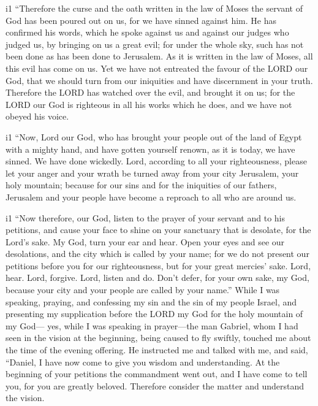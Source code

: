 i1 ``Therefore the curse and the oath written in the law of Moses the
servant of God has been poured out on us, for we have sinned against
him.  He has confirmed his words, which he spoke against
us and against our judges who judged us, by bringing on us a great evil;
for under the whole sky, such has not been done as has been done to
Jerusalem.  As it is written in the law of Moses, all
this evil has come on us. Yet we have not entreated the favour of the
LORD our God, that we should turn from our iniquities and have
discernment in your truth.  Therefore the LORD has
watched over the evil, and brought it on us; for the LORD our God is
righteous in all his works which he does, and we have not obeyed his
voice.

i1 ``Now, Lord our God, who has brought your people out
of the land of Egypt with a mighty hand, and have gotten yourself
renown, as it is today, we have sinned. We have done wickedly.
 Lord, according to all your righteousness, please let
your anger and your wrath be turned away from your city Jerusalem, your
holy mountain; because for our sins and for the iniquities of our
fathers, Jerusalem and your people have become a reproach to all who are
around us.

i1 ``Now therefore, our God, listen to the prayer of your
servant and to his petitions, and cause your face to shine on your
sanctuary that is desolate, for the Lord's sake.  My God,
turn your ear and hear. Open your eyes and see our desolations, and the
city which is called by your name; for we do not present our petitions
before you for our righteousness, but for your great mercies' sake.
 Lord, hear. Lord, forgive. Lord, listen and do. Don't
defer, for your own sake, my God, because your city and your people are
called by your name.''  While I was speaking, praying,
and confessing my sin and the sin of my people Israel, and presenting my
supplication before the LORD my God for the holy mountain of my God---
 yes, while I was speaking in prayer---the man Gabriel,
whom I had seen in the vision at the beginning, being caused to fly
swiftly, touched me about the time of the evening offering.
 He instructed me and talked with me, and said, ``Daniel,
I have now come to give you wisdom and understanding.  At
the beginning of your petitions the commandment went out, and I have
come to tell you, for you are greatly beloved. Therefore consider the
matter and understand the vision.

